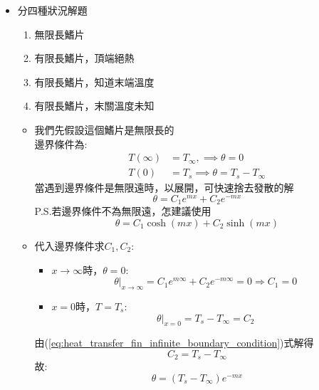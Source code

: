 \documentclass[../main.tex]{subfiles}
\begin{document}
\begin{itemize}
\begin{itemize}
\begin{equation}
    \end{equation}
    \item 分四種狀況解題
    \begin{enumerate}
      \item 無限長鰭片
      \item 有限長鰭片，頂端絕熱
      \item 有限長鰭片，知道末端溫度
      \item 有限長鰭片，末關溫度未知
    \end{enumerate}
    \begin{itemize}
      \item 我們先假設這個鰭片是無限長的\\
      邊界條件為:
      \begin{align}
        T(\infty) &= T_\infty, \implies \theta = 0 \nonumber\\
        T(0) &= T_s \implies \theta = T_s - T_\infty
      \end{align}
      當遇到邊界條件是無限遠時，以展開，可快速捨去發散的解
      \begin{equation}
        \theta = C_1 e^{mx} + C_2 e^{-mx}
      \end{equation}
      P.S.若邊界條件不為無限遠，怎建議使用
      \begin{equation}
        \theta = C_1 \cosh(mx) + C_2 \sinh(mx)
      \end{equation}
      \item 代入邊界條件求$C_1, C_2$:
      \begin{itemize}
        \item $x\to \infty$時，$\theta=0$:
        \begin{equation}
          \theta|_{x\to\infty} = C_1 e^{m\infty} + C_2 e^{-m\infty} = 0 \Rightarrow C_1 = 0
        \end{equation}
        \item $x=0$時，$T=T_s$:
        \begin{equation}
          \theta|_{x=0} = T_s - T_\infty = C_2 \label{eq:heat_transfer_fin_infinite_boundary_condition}
        \end{equation}
      \end{itemize}
      由(\ref{eq:heat_transfer_fin_infinite_boundary_condition})式解得
      \begin{equation}
        C_2 = T_s - T_\infty
      \end{equation}
      故:
      \begin{equation}
        \theta = (T_s - T_\infty) e^{-mx}
      \end{equation}

\end{itemize}
\end{itemize}
\end{itemize}
\end{document}
